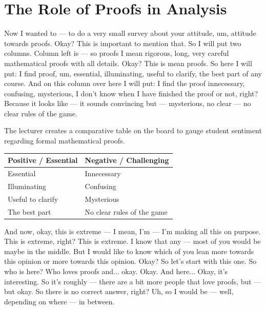 \section{The Role of Proofs in Analysis}

\begin{spoken-clean}[00:22:00 - 00:24:15]
Now I wanted to — to do a very small survey about your attitude, um, attitude towards proofs. Okay? This is important to mention that.  So I will put two columns. Column left is  — so proofs I mean rigorous, long, very careful mathematical proofs with all details. Okay? This is mean proofs. So here I will put: I find proof, um, essential, illuminating, useful to clarify, the best part of any course. And on this column over here I will put: I find the proof innecessary, confusing, mysterious, I don't know when I have finished the proof or not, right? Because it looks like — it sounds convincing but — mysterious, no clear — no clear rules of the game.
\end{spoken-clean}

\begin{math-stroke}
The lecturer creates a comparative table on the board to gauge student sentiment regarding formal mathematical proofs.
\begin{center}
\begin{tabular}{l | l}
\textbf{Positive / Essential} & \textbf{Negative / Challenging} \\ \hline
Essential & Innecessary \\
Illuminating & Confusing \\
Useful to clarify & Mysterious \\
The best part & No clear rules of the game
\end{tabular}
\end{center}
\end{math-stroke}

\begin{spoken-clean}[00:24:15 - 00:26:15]
And now, okay, this is extreme — I mean, I'm — I'm making all this on purpose. This is extreme, right? This is extreme. I know that any — most of you would be maybe in the middle. But I would like to know which of you lean more towards this opinion or more towards this opinion. Okay? So let's start with this one. So who is here? Who loves proofs and... okay.  Okay. And here...  Okay, it's interesting. So it's roughly — there are a bit more people that love proofs, but — but okay. So there is no correct answer, right? Uh, so I would be — well, depending on where — in between.
\end{spoken-clean}

